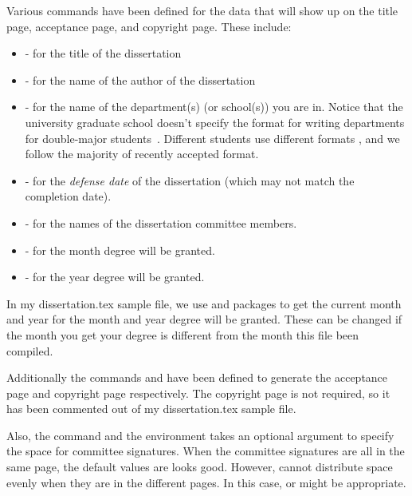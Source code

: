 Various commands have been defined for the data that will show up on the title page, acceptance page, and copyright page.  These include:
\begin{itemize}
 \item {} - for the title of the dissertation
 \item {} - for the name of the author of the dissertation
 \item {} - for the name of the department(s) (or school(s)) you are in.  Notice that the university graduate school doesn't specify the format for writing departments for double-major students~\cite{DoctoralFormatting2018}.  Different students use different formats \cite{Hansen2015,Agmon2016,Bambach2016}, and we follow the majority of recently accepted format.
 \item {} - for the \emph{defense date} of the dissertation (which may not match the completion date).
 \item {} - for the names of the dissertation committee members.
 \item {} - for the month degree will be granted. 
 \item {} - for the year degree will be granted.
\end{itemize}

In my dissertation.tex sample file, we use  and  packages to get the current month and year for the month and year degree will be granted. These can be changed if the month you get your degree is different from the month this file been compiled.

Additionally the commands  and  have been defined to generate the acceptance page and copyright page
respectively.  The copyright page is not required, so it has been commented out of my dissertation.tex sample file.

Also, the command  and the 
environment takes an optional argument to specify the space for committee
signatures. When the committee signatures are all in the same page, the default
values are  looks good. However,  cannot distribute space evenly when they are in the different pages. In
this case,  or  might be appropriate.

